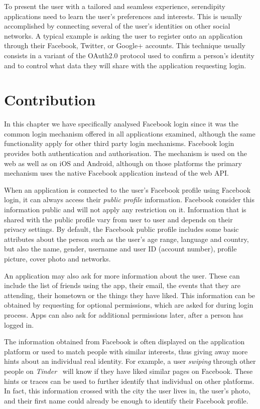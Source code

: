 To present the user with a tailored and seamless experience, serendipity applications need to learn the user's preferences and interests. This is usually accomplished by connecting several of the user's identities on other social networks. A typical example is asking the user to register onto an application through their Facebook, Twitter, or Google+ accounts. This technique usually consists in a variant of the OAuth2.0 protocol used to confirm a person's identity and to control what data they will share with the application requesting login.

\section{Contribution}

In this chapter we have specifically analysed Facebook login since it was the common login mechanism offered in all applications examined, although the same functionality apply for other third party login mechanisms. Facebook login provides both authentication and authorisation. The mechanism is used on the web as well as on iOS and Android, although on those platforms the primary mechanism uses the native Facebook application instead of the web API.

When an application is connected to the user's Facebook profile using Facebook login, it can always access their \emph{public profile} information. Facebook consider this information public and will not apply any restriction on it. Information that is shared with the public profile vary from user to user and depends on their privacy settings. By default, the Facebook public profile includes some basic attributes about the person such as the user's age range, language and country, but also the name, gender, username and user ID (account number), profile picture, cover photo and networks.

An application may also ask for more information about the user. These can include the list of friends using the app, their email, the events that they are attending, their hometown or the things they have liked. This information can be obtained by requesting for optional permissions, which are asked for during login process. Apps can also ask for additional permissions later, after a person has logged in.

The information obtained from Facebook is often displayed on the application platform or used to match people with similar interests, thus giving away more hints about an individual real identity. For example, a user \emph{swiping} through other people on \emph{Tinder}~\cite{tinder} will know if they have liked similar pages on Facebook.
These hints or traces can be used to further identify that individual on other platforms. In fact, this information crossed with the city the user lives in, the user's photo, and their first name could already be enough to identify their Facebook profile.

